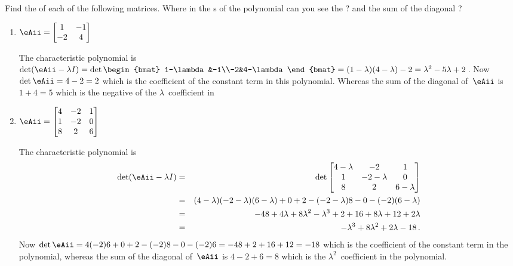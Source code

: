 \begin{example} 
Find the  of each of the following matrices.  
Where in the s of the polynomial can you see the ? and the sum of the diagonal ?
\begin{enumerate}
\item \(\eAii=\begin{bmatrix} 1&-1\\-2&4 \end{bmatrix}\)
\begin{solution} 
The characteristic polynomial is \(\det(\eAii-\lambda I)
=\det\begin{bmat} 1-\lambda&-1\\-2&4-\lambda \end{bmat}
=(1-\lambda)(4-\lambda)-2
=\lambda^2-5\lambda+2\)\,.
Now \(\det \eAii=4-2=2\) which is the coefficient of the constant term in this polynomial.
Whereas the sum of the diagonal of~\(\eAii\) is \(1+4=5\) which is the negative of the \(\lambda\)~coefficient in 
\end{solution}

\item \(\eAii=\begin{bmatrix}4&-2&1
\\1&-2&0
\\8&2&6 \end{bmatrix}\)
\begin{solution} 
The characteristic polynomial is 
\begin{eqnarray*}
\det(\eAii-\lambda I)
&=&\det\begin{bmatrix} 4-\lambda&-2&1
\\1&-2-\lambda&0
\\8&2&6-\lambda \end{bmatrix}
\\&=&(4-\lambda)(-2-\lambda)(6-\lambda)+0+2
-(-2-\lambda)8-0-(-2)(6-\lambda)
\\&=&-48+4\lambda+8\lambda^2-\lambda^3+2
+16+8\lambda+12+2\lambda
\\&=&-\lambda^3+8\lambda^2+2\lambda-18\,.
\end{eqnarray*}
Now \(\det \eAii=4(-2)6+0+2-(-2)8-0-(-2)6=-48+2+16+12=-18\) which is the coefficient of the constant term in the polynomial,
whereas the sum of the diagonal of~\(\eAii\) is \(4-2+6=8\) which is the \(\lambda^2\)~coefficient in the polynomial.
\end{solution}

\end{enumerate}
\end{example}




